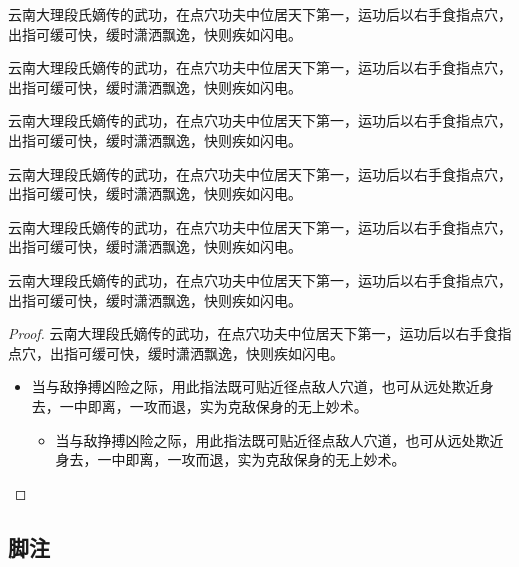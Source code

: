 \documentclass[QingNianC, vlined, timesmathnogreek]{nsfc}
\begin{document}
	\begin{proposition}[具体名称]
		云南大理段氏嫡传的武功，在点穴功夫中位居天下第一，运功后以右手食指点穴，出指可缓可快，缓时潇洒飘逸，快则疾如闪电。
	\end{proposition}
	
	\begin{corollary}[具体名称]
		云南大理段氏嫡传的武功，在点穴功夫中位居天下第一，运功后以右手食指点穴，出指可缓可快，缓时潇洒飘逸，快则疾如闪电。
	\end{corollary}
	
	\begin{lemma}[具体名称]
		云南大理段氏嫡传的武功，在点穴功夫中位居天下第一，运功后以右手食指点穴，出指可缓可快，缓时潇洒飘逸，快则疾如闪电。
	\end{lemma}

	\begin{example}[具体名称]
		云南大理段氏嫡传的武功，在点穴功夫中位居天下第一，运功后以右手食指点穴，出指可缓可快，缓时潇洒飘逸，快则疾如闪电。
	\end{example}

	\begin{assumption}[具体名称]
		云南大理段氏嫡传的武功，在点穴功夫中位居天下第一，运功后以右手食指点穴，出指可缓可快，缓时潇洒飘逸，快则疾如闪电。
	\end{assumption}

	\begin{annotation}[具体名称]
		云南大理段氏嫡传的武功，在点穴功夫中位居天下第一，运功后以右手食指点穴，出指可缓可快，缓时潇洒飘逸，快则疾如闪电。
	\end{annotation}
	
	\begin{proof}
		云南大理段氏嫡传的武功，在点穴功夫中位居天下第一，运功后以右手食指点穴，出指可缓可快，缓时潇洒飘逸，快则疾如闪电。
		\begin{itemize}
			\item 当与敌挣搏凶险之际，用此指法既可贴近径点敌人穴道，也可从远处欺近身去，一中即离，一攻而退，实为克敌保身的无上妙术。
			\begin{itemize}
				\item 当与敌挣搏凶险之际，用此指法既可贴近径点敌人穴道，也可从远处欺近身去，一中即离，一攻而退，实为克敌保身的无上妙术。
			\end{itemize}
		\end{itemize}
	\end{proof}

	\subsection{脚注}
	
\end{document}
